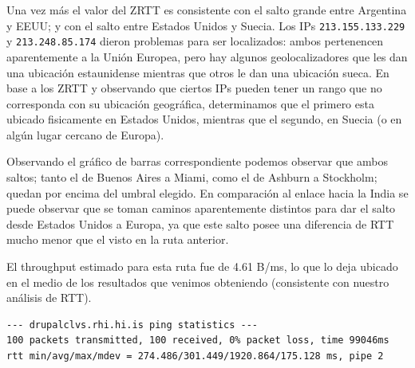 \vspace{20pt}

Una vez más el valor del ZRTT es consistente con el salto grande entre Argentina y EEUU; y con el salto entre Estados Unidos y Suecia. Los IPs \verb|213.155.133.229| y \verb|213.248.85.174| dieron problemas para ser localizados: ambos pertenencen aparentemente a la Unión Europea, pero hay algunos geolocalizadores que les dan una ubicación estaunidense mientras que otros le dan una ubicación sueca. En base a los ZRTT y observando que ciertos IPs pueden tener un rango que no corresponda con su ubicación geográfica, determinamos que el primero esta ubicado fisicamente en Estados Unidos, mientras que el segundo, en Suecia (o en algún lugar cercano de Europa).

Observando el gráfico de barras correspondiente podemos observar que ambos saltos; tanto el de Buenos Aires a Miami, como el de Ashburn a Stockholm; quedan por encima del umbral elegido. En comparación al enlace hacia la India se puede observar que se toman caminos aparentemente distintos para dar el salto desde Estados Unidos a Europa, ya que este salto posee una diferencia de RTT mucho menor que el visto en la ruta anterior.

El throughput estimado para esta ruta fue de 4.61 B/ms, lo que lo deja ubicado en el medio de los resultados que venimos obteniendo (consistente con nuestro análisis de RTT).

\begin{verbatim}
--- drupalclvs.rhi.hi.is ping statistics ---
100 packets transmitted, 100 received, 0% packet loss, time 99046ms
rtt min/avg/max/mdev = 274.486/301.449/1920.864/175.128 ms, pipe 2
\end{verbatim}

